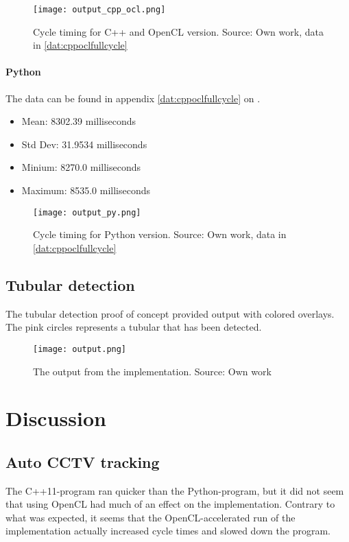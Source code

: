 \begin{figure}[ht]
    \centering
    \texttt{[image: output\_cpp\_ocl.png]}
    \caption{Cycle timing for C++ and OpenCL version. Source: Own work, data in \ref{dat:cppoclfullcycle}}
    \label{fig:output_cpp_ocl}
\end{figure}
\FloatBarrier

\paragraph{Python}
The data can be found in appendix \ref{dat:cppoclfullcycle} on \pageref{dat:cppoclfullcycle}.

\begin{itemize}
\item Mean: 8302.39 milliseconds
\item Std Dev: 31.9534 milliseconds
\item Minium: 8270.0 milliseconds
\item Maximum: 8535.0 milliseconds
\end{itemize}

\begin{figure}[ht]
    \centering
    \texttt{[image: output\_py.png]}
    \caption{Cycle timing for Python version. Source: Own work, data in \ref{dat:cppoclfullcycle}}
    \label{fig:output_cpp_ocl}
\end{figure}
\FloatBarrier



\subsection{Tubular detection}
The tubular detection proof of concept provided output with colored overlays. The pink circles represents a tubular that has been detected.

\begin{figure}[ht]
    \centering
    \texttt{[image: output.png]}
    \caption{The output from the implementation. Source: Own work}
    \label{fig:output}
\end{figure}
\FloatBarrier

\section{Discussion}
\subsection{Auto CCTV tracking}
The C++11-program ran quicker than the Python-program, but it did not seem that using OpenCL had much of an effect on the implementation. Contrary to what was expected, it seems that the OpenCL-accelerated run of the implementation actually increased cycle times and slowed down the program.

